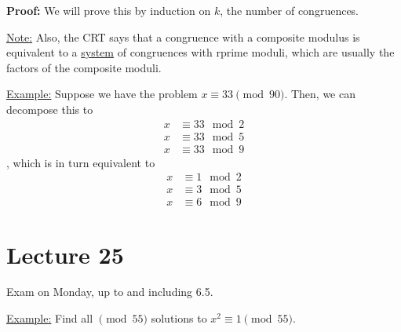 \documentclass{article}
\begin{document}
\textbf{Proof:} We will prove this by induction on $k$, the number of congruences. 

\underline{Note:} Also, the CRT says that a congruence with a composite modulus is equivalent to a \underline{system} of congruences with rprime moduli, which are usually the factors of the composite moduli. 

\underline{Example:} Suppose we have the problem $x\equiv 33\pmod{90}$. Then, we can decompose this to \begin{align*}
    x&\equiv 33\mod 2\\
    x&\equiv 33\mod 5\\
    x&\equiv 33\mod 9
\end{align*}, which is in turn equivalent to \begin{align*}
    x&\equiv 1\mod 2\\
    x&\equiv 3\mod 5\\
    x&\equiv 6\mod 9
\end{align*}

\section{Lecture 25}

Exam on Monday, up to and including 6.5.

\underline{Example:} Find all $\pmod{55}$ solutions to $x^2\equiv 1\pmod{55}$. 
\end{document}
